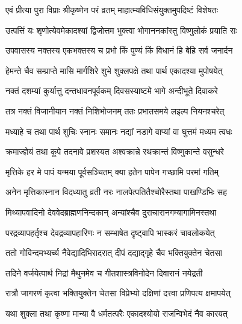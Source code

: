 \label{sec:vrata-raja-margashirsha-krishna}


\twolineshloka
{एवं प्रीत्या पुरा विप्राः श्रीकृष्णेन परं व्रतम्}
{माहात्म्यविधिसंयुक्तमुपदिष्टं विशेषतः} %

\twolineshloka
{उत्पत्तिं यः शृणोत्येवमेकादश्यां द्विजोत्तम}
{भुक्त्वा भोगाननकांस्तु विष्णुलोकं प्रयाति सः} %


\twolineshloka
{उपवासस्य नक्तस्य एकभक्तस्य च प्रभो}
{किं पुण्यं किं विधानं हि बेहि सर्व जनार्दन} %


\twolineshloka
{हेमन्ते चैव सम्प्राप्ते मासि मार्गशिरे शुभे}
{शुक्लपक्षे तथा पार्थ एकादश्या मुपोषयेत्} %

\twolineshloka
{नक्तं दशम्यां कुर्यात्तु दन्तधावनपूर्वकम्}
{दिवसस्याष्टमे भागे अन्दीभूते दिवाकरे} %

\twolineshloka
{तत्र नक्तं विजानीयान नक्तं निशिभोजनम्}
{ततः प्रभातसमये लइल्प नियनश्चरेत्} %

\twolineshloka
{मध्याहे च तथा पार्थ शुचिः स्नानः समानः}
{नद्यां नडागे वाप्यां वा घुत्तमं मध्यम त्वधः} %

\twolineshloka
{क्रमाज्ज्ञेयं तथा कूपे तदनावे प्रशस्यत}
{अश्वक्रान्ने रथक्रान्तं विष्णुकान्ते वसुन्धरे} %

\twolineshloka
{मृत्तिके हर मे पापं यन्मया पूर्वसञ्चितम्}
{क्या हतेन पापेन गच्छामि परमां गतिम्} %

\twolineshloka
{अनेन मृत्तिकास्नान विदध्यातु व्रती नरः}
{नालपेत्पतितैश्चोरैस्तथा पाखण्डिभिः सह} %

\twolineshloka
{मिथ्यापवादिनो देववेदब्राह्मणनिन्दकान्}
{अन्यांश्चैव दुराचारानगम्यागामिनस्तथा} %

\twolineshloka
{परद्रव्यापहर्तृश्च देवद्रव्यापहारिणः}
{न सम्भाषेत दृष्ट्वापि भास्करं चावलोकयेत्} %

\twolineshloka
{ततो गोविन्दमभ्यर्च्य नैवेद्यादिभिरादरात्}
{दीपं दद्याद्गृहे चैव भक्तियुक्तेन चेतसा} %

\twolineshloka
{तदिने वर्जयेत्पार्थ निद्रां मैथुनमेव च}
{गीतशास्त्रविनोदेन दिवारानं नयेद्रती} %

\twolineshloka
{रात्रौ जागरणं कृत्वा भक्तियुक्तेन चेतसा}
{विप्रेभ्यो दक्षिणां दत्त्वा प्रणिपत्य क्षमापयेत्} %

\twolineshloka
{यथा शुक्ला तथा कृष्णा मान्या वै धर्मतत्परैः}
{एकादश्योयो राजन्विभेदं नैव कारयत्} %

